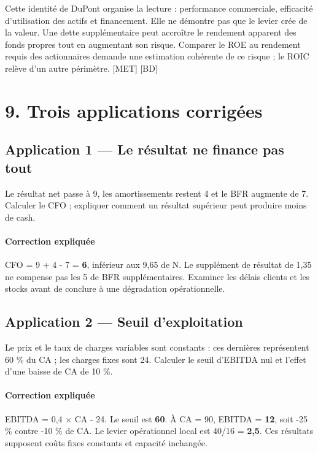 \documentclass[12pt,a4paper]{article}
\begin{document}
Cette identité de DuPont organise la lecture : performance commerciale, efficacité d’utilisation des actifs et financement. Elle ne démontre pas que le levier crée de la valeur. Une dette supplémentaire peut accroître le rendement apparent des fonds propres tout en augmentant son risque. Comparer le ROE au rendement requis des actionnaires demande une estimation cohérente de ce risque ; le ROIC relève d’un autre périmètre. [MET] [BD]

\section*{9. Trois applications corrigées}

\subsection*{Application 1 --- Le résultat ne finance pas tout}
Le résultat net passe à 9, les amortissements restent 4 et le BFR augmente de 7. Calculer le CFO ; expliquer comment un résultat supérieur peut produire moins de cash.


\paragraph{Correction expliquée}
CFO = 9 + 4 - 7 = \textbf{6}, inférieur aux 9,65 de N. Le supplément de résultat de 1,35 ne compense pas les 5 de BFR supplémentaires. Examiner les délais clients et les stocks avant de conclure à une dégradation opérationnelle.



\subsection*{Application 2 --- Seuil d’exploitation}
Le prix et le taux de charges variables sont constants : ces dernières représentent 60 \% du CA ; les charges fixes sont 24. Calculer le seuil d’EBITDA nul et l’effet d’une baisse de CA de 10 \%.


\paragraph{Correction expliquée}
EBITDA = 0,4 $\times$ CA - 24. Le seuil est \textbf{60}. À CA = 90, EBITDA = \textbf{12}, soit -25 \% contre -10 \% de CA. Le levier opérationnel local est 40/16 = \textbf{2,5}. Ces résultats supposent coûts fixes constants et capacité inchangée.
\end{document}
